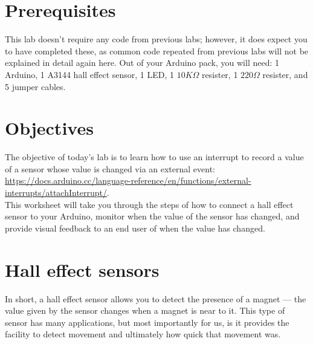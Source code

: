 \documentclass[11pt,a4paper]{article}
\begin{document}
\pagestyle{fancy}

\section*{Prerequisites}
This lab doesn't require any code from previous labs; however, it does expect you to have completed these, as common code repeated from previous labs will not be explained in detail again here. Out of your Arduino pack, you will need: 1 Arduino, 1 A3144 hall effect sensor, 1 LED, 1 $10K\Omega$ resister, 1 $220\Omega$ resister, and 5 jumper cables.

\section*{Objectives}
The objective of today's lab is to learn how to use an interrupt to record a value of a sensor whose value is changed via an external event: \url{https://docs.arduino.cc/language-reference/en/functions/external-interrupts/attachInterrupt/}.\\

\noindent
This worksheet will take you through the steps of how to connect a hall effect sensor to your Arduino, monitor when the value of the sensor has changed, and provide visual feedback to an end user of when the value has changed.

\section*{Hall effect sensors}
In short, a hall effect sensor allows you to detect the presence of a magnet --- the value given by the sensor changes when a magnet is near to it. This type of sensor has many applications, but most importantly for us, is it provides the facility to detect movement and ultimately how quick that movement was.\\
\end{document}
